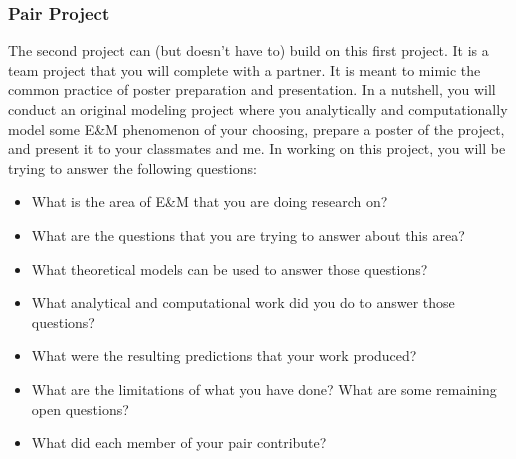 \documentclass[letterpaper,10pt,english]{jupyterBook}
\begin{document}
\subsubsection{Pair Project}
\label{\detokenize{content/0_course/assessments:pair-project}}
\sphinxAtStartPar
The second project can (but doesn’t have to) build on this first project. It is a team project that you will complete with a partner. It is meant to mimic the common practice of poster preparation and presentation. In a nutshell, you will conduct an original modeling project where you analytically and computationally model some E\&M phenomenon of your choosing, prepare a poster of the project, and present it to your classmates and me. In working on this project, you will be trying to answer the following questions:
\begin{itemize}
\item {} 
\sphinxAtStartPar
What is the area of E\&M that you are doing research on?

\item {} 
\sphinxAtStartPar
What are the questions that you are trying to answer about this area?

\item {} 
\sphinxAtStartPar
What theoretical models can be used to answer those questions?

\item {} 
\sphinxAtStartPar
What analytical and computational work did you do to answer those questions?

\item {} 
\sphinxAtStartPar
What were the resulting predictions that your work produced?

\item {} 
\sphinxAtStartPar
What are the limitations of what you have done? What are some remaining open questions?

\item {} 
\sphinxAtStartPar
What did each member of your pair contribute?

\end{itemize}
\end{document}
